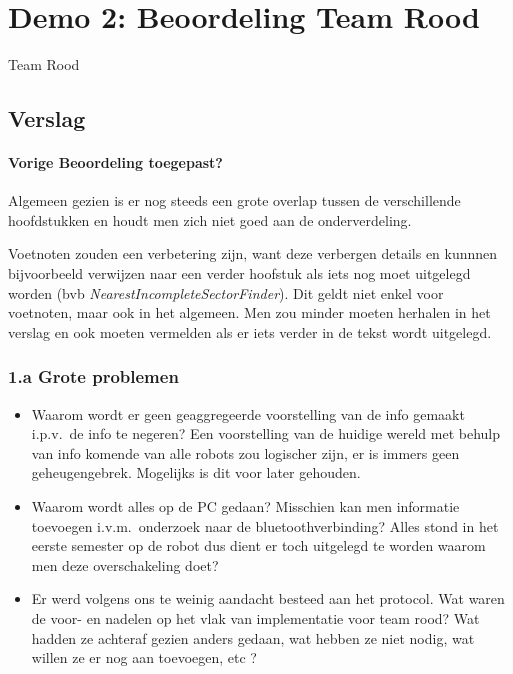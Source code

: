 \documentclass[12pt,a4paper]{report}
\begin{document}
\section{Demo 2: Beoordeling Team Rood}
\begin{center}
Team Rood
\end{center}

\subsection{ Verslag} 
     
\paragraph{Vorige Beoordeling toegepast?}

Algemeen gezien is er nog steeds een grote overlap tussen de verschillende hoofdstukken en houdt men zich niet goed aan de onderverdeling.
\par Voetnoten zouden een verbetering zijn, want deze verbergen details en kunnnen bijvoorbeeld verwijzen naar een verder hoofstuk als iets nog moet uitgelegd worden (bvb \textit{NearestIncompleteSectorFinder}). Dit geldt niet enkel voor voetnoten, maar ook in het algemeen. Men zou minder moeten herhalen in het verslag en ook moeten vermelden als er iets verder in de tekst wordt uitgelegd.
\subsubsection{1.a Grote problemen}

\begin{itemize}
	\item Waarom wordt er geen geaggregeerde voorstelling van de info gemaakt i.p.v.\ de info te negeren? Een voorstelling van de huidige wereld met behulp van info komende van alle robots zou logischer zijn, er is immers geen geheugengebrek. Mogelijks is dit voor later gehouden.
	\item Waarom wordt alles op de PC gedaan? Misschien kan men informatie toevoegen i.v.m.\ onderzoek naar de bluetoothverbinding? Alles stond in het eerste semester op de robot dus dient er toch uitgelegd te worden waarom men deze overschakeling doet?
	\item Er werd volgens ons te weinig aandacht besteed aan het protocol. Wat waren de voor- en nadelen op het vlak van implementatie voor team rood? Wat hadden ze achteraf gezien anders gedaan, wat hebben ze niet nodig, wat willen ze er nog aan toevoegen, etc ?
\end{itemize}
\end{document}

